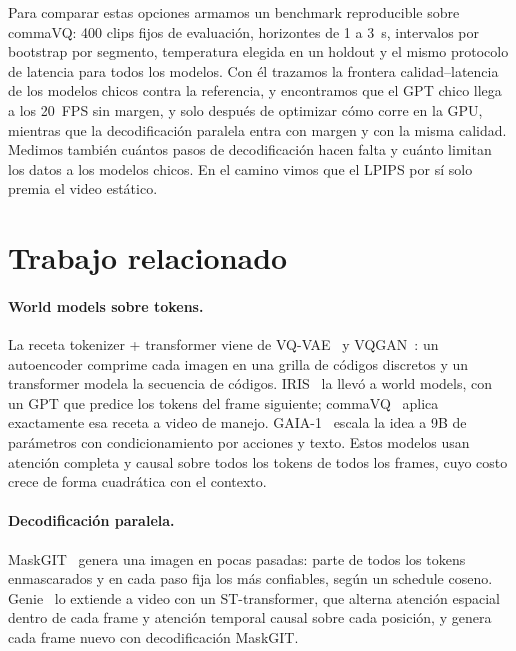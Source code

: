 \documentclass[10pt,twocolumn,a4paper]{article}
\DeclareRobustCommand{\editado}[1]{\textcolor{editado}{#1}}
\DeclareRobustCommand{\editado}[1]{#1}
\begin{document}
\editado{Para comparar estas opciones armamos un benchmark reproducible sobre commaVQ: 400 clips fijos de evaluación, horizontes de 1 a 3~s, intervalos por bootstrap por segmento, temperatura elegida en un holdout y el mismo protocolo de latencia para todos los modelos. Con él trazamos la frontera calidad--latencia de los modelos chicos contra la referencia, y encontramos que el GPT chico llega a los 20~FPS sin margen, y solo después de optimizar cómo corre en la GPU, mientras que la decodificación paralela entra con margen y con la misma calidad. Medimos también cuántos pasos de decodificación hacen falta y cuánto limitan los datos a los modelos chicos. En el camino vimos que el LPIPS por sí solo premia el video estático.}

\section{Trabajo relacionado}

\paragraph{World models sobre tokens.} La receta tokenizer + transformer viene de VQ-VAE~\cite{vandenoord2017vqvae} y VQGAN~\cite{esser2021vqgan}: un autoencoder comprime cada imagen en una grilla de códigos discretos y un transformer modela la secuencia de códigos. IRIS~\cite{micheli2023iris} la llevó a world models, con un GPT que predice los tokens del frame siguiente; commaVQ~\cite{commavq} aplica exactamente esa receta a video de manejo. GAIA-1~\cite{hu2023gaia1} escala la idea a 9B de parámetros con condicionamiento por acciones y texto. Estos modelos usan atención completa y causal sobre todos los tokens de todos los frames, cuyo costo crece de forma cuadrática con el contexto.

\paragraph{Decodificación paralela.} MaskGIT~\cite{chang2022maskgit} genera una imagen en pocas pasadas: parte de todos los tokens enmascarados y en cada paso fija los más confiables, según un schedule coseno. Genie~\cite{bruce2024genie} lo extiende a video con un ST-transformer, que alterna atención espacial dentro de cada frame y atención temporal causal sobre cada posición, y genera cada frame nuevo con decodificación MaskGIT.
\end{document}

